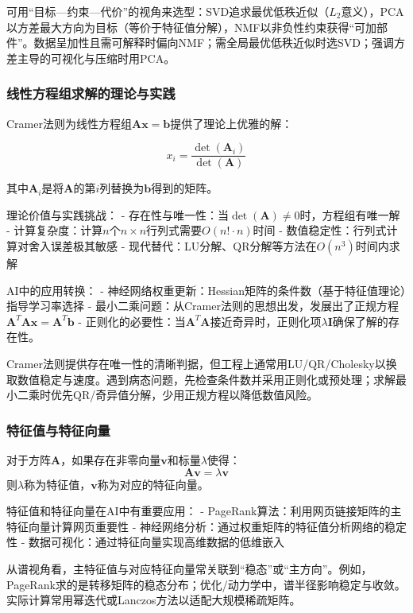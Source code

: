 可用“目标—约束—代价”的视角来选型：SVD追求最优低秩近似（$L_2$意义），PCA以方差最大方向为目标（等价于特征值分解），NMF以非负性约束获得“可加部件”。数据呈加性且需可解释时偏向NMF；需全局最优低秩近似时选SVD；强调方差主导的可视化与压缩时用PCA。

\subsubsection{线性方程组求解的理论与实践}

Cramer法则为线性方程组$\mathbf{A}\mathbf{x} = \mathbf{b}$提供了理论上优雅的解：

$$x_i = \frac{\det(\mathbf{A}_i)}{\det(\mathbf{A})}$$

其中$\mathbf{A}_i$是将$\mathbf{A}$的第$i$列替换为$\mathbf{b}$得到的矩阵。

理论价值与实践挑战：
- 存在性与唯一性：当$\det(\mathbf{A}) \neq 0$时，方程组有唯一解
- 计算复杂度：计算$n$个$n \times n$行列式需要$O(n! \cdot n)$时间
- 数值稳定性：行列式计算对舍入误差极其敏感
- 现代替代：LU分解、QR分解等方法在$O(n^3)$时间内求解

AI中的应用转换：
- 神经网络权重更新：Hessian矩阵的条件数（基于特征值理论）指导学习率选择
- 最小二乘问题：从Cramer法则的思想出发，发展出了正规方程$\mathbf{A}^T\mathbf{A}\mathbf{x} = \mathbf{A}^T\mathbf{b}$
- 正则化的必要性：当$\mathbf{A}^T\mathbf{A}$接近奇异时，正则化项$\lambda\mathbf{I}$确保了解的存在性。

Cramer法则提供存在唯一性的清晰判据，但工程上通常用LU/QR/Cholesky以换取数值稳定与速度。遇到病态问题，先检查条件数并采用正则化或预处理；求解最小二乘时优先QR/奇异值分解，少用正规方程以降低数值风险。

\subsubsection{特征值与特征向量}
对于方阵$\mathbf{A}$，如果存在非零向量$\mathbf{v}$和标量$\lambda$使得：
$$\mathbf{A}\mathbf{v} = \lambda\mathbf{v}$$
则$\lambda$称为特征值，$\mathbf{v}$称为对应的特征向量。

特征值和特征向量在AI中有重要应用：
- PageRank算法：利用网页链接矩阵的主特征向量计算网页重要性
- 神经网络分析：通过权重矩阵的特征值分析网络的稳定性
- 数据可视化：通过特征向量实现高维数据的低维嵌入

从谱视角看，主特征值与对应特征向量常关联到“稳态”或“主方向”。例如，PageRank求的是转移矩阵的稳态分布；优化/动力学中，谱半径影响稳定与收敛。实际计算常用幂迭代或Lanczos方法以适配大规模稀疏矩阵。

